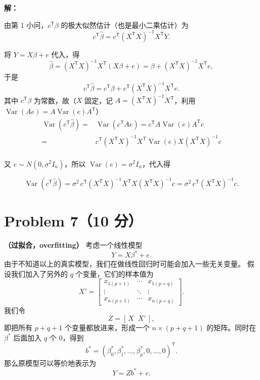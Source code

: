 \documentclass[12pt,a4paper]{article}
\begin{document}
\begin{answerbox}
\textbf{解：}

由第 1 小问，$c^{\mathsf T}\beta$ 的极大似然估计（也是最小二乘估计）为
$$
c^{\mathsf T}\hat{\beta}
=c^{\mathsf T}(X^{\mathsf T}X)^{-1}X^{\mathsf T}Y.
$$

将 $Y=X\beta+e$ 代入，得
$$
\hat{\beta}
=(X^{\mathsf T}X)^{-1}X^{\mathsf T}(X\beta+e)
=\beta+(X^{\mathsf T}X)^{-1}X^{\mathsf T}e,
$$
于是
$$
c^{\mathsf T}\hat{\beta}=c^{\mathsf T}\beta+c^{\mathsf T}(X^{\mathsf T}X)^{-1}X^{\mathsf T}e.
$$
其中 $c^{\mathsf T}\beta$ 为常数，故（$X$ 固定，记 $A=(X^{\mathsf T}X)^{-1}X^{\mathsf T}$，利用 $\operatorname{Var}(Ae)=A\operatorname{Var}(e)A^{\mathsf T}$）
$$
\begin{aligned}
\operatorname{Var}\left(c^{\mathsf T}\hat{\beta}\right)
=&\operatorname{Var}\left(c^{\mathsf T}Ae\right)
=c^{\mathsf T}A\operatorname{Var}\left(e\right)A^{\mathsf T}c\\
=&c^{\mathsf T}(X^{\mathsf T}X)^{-1}X^{\mathsf T}\operatorname{Var}\left(e\right)X(X^{\mathsf T}X)^{-1}c\\
\end{aligned}
$$

又 $e\sim N(0, \sigma^2 I_n)$，所以 $\operatorname{Var}\left(e\right)=\sigma^2 I_n$，代入得

$$
\operatorname{Var}\left(c^{\mathsf T}\hat{\beta}\right)
=\sigma^2\,c^{\mathsf T}(X^{\mathsf T}X)^{-1}X^{\mathsf T}X(X^{\mathsf T}X)^{-1}c
=\sigma^2\,c^{\mathsf T}(X^{\mathsf T}X)^{-1}c.
$$
\end{answerbox}


\section{Problem 7（10 分）}

\textbf{（过拟合，overfitting）}
考虑一个线性模型
\[
  Y=X\beta^*+e.
\]
由于不知道以上的真实模型，我们在做线性回归时可能会加入一些无关变量。
假设我们加入了另外的 $q$ 个变量，它们的样本值为
\[
  X'
  =
  \begin{bmatrix}
    x_{1(p+1)} & \cdots & x_{1(p+q)} \\
    \vdots     & \ddots & \vdots \\
    x_{n(p+1)} & \cdots & x_{n(p+q)}
  \end{bmatrix}.
\]
我们令
\[
  Z=[\,X\;\;X'\,],
\]
即把所有 $p+q+1$ 个变量都放进来，形成一个
$n\times(p+q+1)$ 的矩阵。同时在 $\beta^*$ 后面加入 $q$ 个 $0$，得到
\[
  b^*=(\beta_0^*,\beta_1^*,\ldots,\beta_p^*,0,\ldots,0)^\mathsf{T}.
\]
那么原模型可以等价地表示为
\[
  Y=Zb^*+e.
\]
\end{document}
